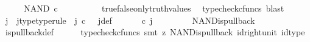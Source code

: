\begin{isabellebody}
\ \ \isamarkupfalse%
\ \isamarkupfalse%
\ {\isachardoublequoteopen}NAND\ {\isasymcirc}\isactrlsub c\ {\isasymlangle}{\isasymt}{\isacharcomma}{\kern0pt}{\isasymt}{\isasymrangle}\ {\isacharequal}{\kern0pt}\ {\isasymt}{\isachardoublequoteclose}\isanewline
\ \ \ \ \isamarkupfalse%
\ \ true{\isacharunderscore}{\kern0pt}false{\isacharunderscore}{\kern0pt}only{\isacharunderscore}{\kern0pt}truth{\isacharunderscore}{\kern0pt}values\ \isamarkupfalse%
\ {\isacharparenleft}{\kern0pt}typecheck{\isacharunderscore}{\kern0pt}cfuncs{\isacharcomma}{\kern0pt}\ blast{\isacharparenright}{\kern0pt}\isanewline
\ \ \isamarkupfalse%
\ \isamarkupfalse%
\ j\ \ j{\isacharunderscore}{\kern0pt}type{\isacharbrackleft}{\kern0pt}type{\isacharunderscore}{\kern0pt}rule{\isacharbrackright}{\kern0pt}{\isacharcolon}{\kern0pt}\ \ {\isachardoublequoteopen}j\ {\isasymin}\isactrlsub c\ {\isasymone}{\isasymCoprod}{\isacharparenleft}{\kern0pt}{\isasymone}{\isasymCoprod}{\isasymone}{\isacharparenright}{\kern0pt}{\isachardoublequoteclose}\ \ j{\isacharunderscore}{\kern0pt}def{\isacharcolon}{\kern0pt}\ {\isachardoublequoteopen}{\isacharparenleft}{\kern0pt}{\isasymlangle}{\isasymf}{\isacharcomma}{\kern0pt}\ {\isasymf}{\isasymrangle}{\isasymamalg}\ {\isacharparenleft}{\kern0pt}{\isasymlangle}{\isasymt}{\isacharcomma}{\kern0pt}\ {\isasymf}{\isasymrangle}\ {\isasymamalg}{\isasymlangle}{\isasymf}{\isacharcomma}{\kern0pt}\ {\isasymt}{\isasymrangle}{\isacharparenright}{\kern0pt}{\isacharparenright}{\kern0pt}\ {\isasymcirc}\isactrlsub c\ j\ \ {\isacharequal}{\kern0pt}\ {\isasymlangle}{\isasymt}{\isacharcomma}{\kern0pt}{\isasymt}{\isasymrangle}{\isachardoublequoteclose}\isanewline
\ \ \ \ \isamarkupfalse%
\ NAND{\isacharunderscore}{\kern0pt}is{\isacharunderscore}{\kern0pt}pullback\ \isamarkupfalse%
\ is{\isacharunderscore}{\kern0pt}pullback{\isacharunderscore}{\kern0pt}def\isanewline
\ \ \ \ \isamarkupfalse%
\ {\isacharparenleft}{\kern0pt}typecheck{\isacharunderscore}{\kern0pt}cfuncs{\isacharcomma}{\kern0pt}\ smt\ {\isacharparenleft}{\kern0pt}z{}{\isacharparenright}{\kern0pt}\ NAND{\isacharunderscore}{\kern0pt}is{\isacharunderscore}{\kern0pt}pullback\ id{\isacharunderscore}{\kern0pt}right{\isacharunderscore}{\kern0pt}unit{}\ id{\isacharunderscore}{\kern0pt}type{\isacharparenright}{\kern0pt}\isanewline
\ \ \isamarkupfalse%
\ \isamarkupfalse%

\end{isabellebody}
